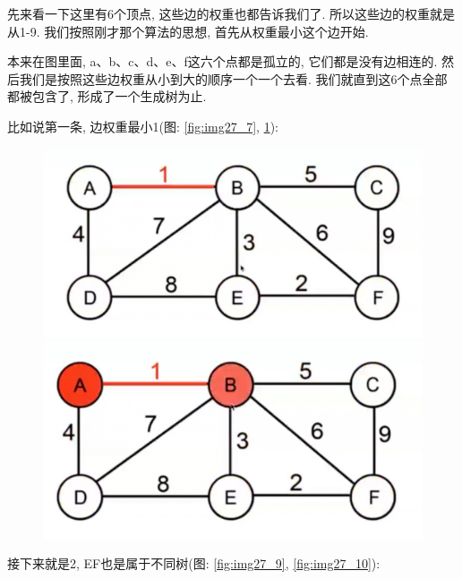 先来看一下这里有6个顶点, 这些边的权重也都告诉我们了. 所以这些边的权重就是从1-9. 我们按照刚才那个算法的思想, 首先从权重最小这个边开始. 

本来在图里面, a、b、c、d、e、f这六个点都是孤立的, 它们都是没有边相连的. 然后我们是按照这些边权重从小到大的顺序一个一个去看. 我们就直到这6个点全部都被包含了, 形成了一个生成树为止. 

比如说第一条, 边权重最小1(图: \ref{fig:img27_7}, \ref{fig:img27_8}):

\begin{figure}[ht]
  \centering
  \begin{minipage}[t]{0.4\textwidth}
    \centering
    \caption{}
    \label{fig:img27_7}
    \includegraphics[width=\textwidth]{asset/aefaaf0e-21e1-4505-aff2-907f9932b2b3.jpg}
  \end{minipage}%
  \hspace{1em}
  \begin{minipage}[t]{0.4\textwidth}
    \centering
    \caption{}
    \label{fig:img27_8}
    \includegraphics[width=\textwidth]{asset/9d0be540-499d-4d9b-9b9b-d3ed959381cf.jpg}
  \end{minipage}
\end{figure}

接下来就是2, EF也是属于不同树(图: \ref{fig:img27_9}, \ref{fig:img27_10}): 

